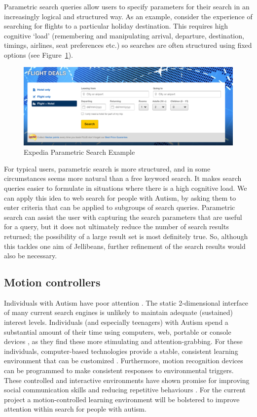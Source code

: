 \documentclass[a4paper, 11pt]{article}
\begin{document}
\vspace{5mm}
Parametric search queries allow users to specify parameters for their search in an increasingly logical and structured way. As an example, consider the experience of searching for flights to a particular holiday destination. This requires high cognitive `load' (remembering and manipulating arrival, departure, destination, timings, airlines, seat preferences etc.) so searches are often structured using fixed options (see Figure~\ref{exped}).

\begin{figure}[H]
\begin{center}
\includegraphics[scale=0.27]{expedia}
\caption{Expedia Parametric Search Example}
\label{exped}
\end{center}
\end{figure}

For typical users, parametric search is more structured, and in some circumstances seems more natural than a free keyword search. It makes search queries easier to formulate in situations where there is a high cognitive load.  We can apply this idea to web search for people with Autism, by asking them to enter criteria that can be applied to subgroups of search queries. Parametric search can assist the user with capturing the search parameters that are useful for a query, but it does not ultimately reduce the number of search results returned; the possibility of a large result set is most definitely true. So, although this tackles one aim of Jellibeans, further refinement of the search results would also be necessary.

\subsection{Motion controllers}
Individuals with Autism have poor attention \cite{attention}. The static 2-dimensional interface of many current search engines is unlikely to maintain adequate (sustained) interest levels. Individuals (and especially teenagers) with Autism spend a substantial amount of their time using computers, web, portable or console devices \cite{Shane and Albert}, as they find these more stimulating and attention-grabbing. For these individuals, computer-based technologies provide a stable, consistent learning environment that can be customized \cite{moore}. Furthermore, motion recognition devices can be programmed to make consistent responses to environmental triggers. These controlled and interactive environments have shown promise for improving social communication skills and reducing repetitive behaviours \cite{gameshealth}. For the current project a motion-controlled learning environment will be bolstered to improve attention within search for people with autism. 
\end{document}
